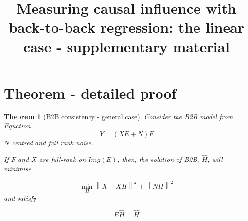 \documentclass{article}
\title{Measuring causal influence with\\ back-to-back regression: the linear case - supplementary material}
\newtheorem{theorem}{Theorem}
\begin{document}
\appendix

\maketitle


\section{Theorem - detailed proof}
\label{sec:theorem}

\begin{theorem}[B2B consistency - general case]

     Consider the B2B model from Equation $$Y = (XE + N)F$$ $N$ centred and full rank noise.

     If $F$ and $X$ are full-rank on $Img(E)$, then, the solution of B2B, $\hat H$, will minimise

     $$\min_H  \left \| X - XH\right\| ^2  + \left \| NH\right \| ^2$$ and satisfy

     $$E\hat H = \hat H$$
\end{theorem}
\end{document}

